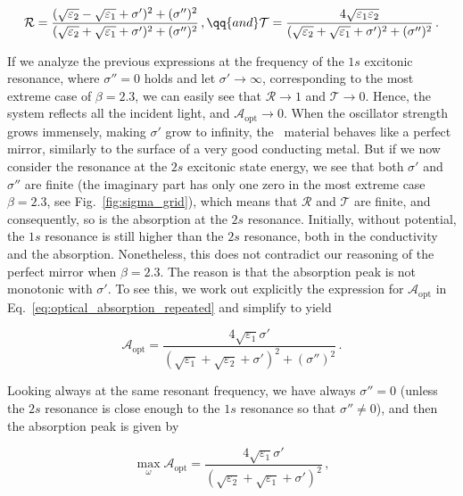 \begin{equation}
\label{eq:reflection_and_transmission}
    \mathcal{R} = \frac{(\sqrt{\varepsilon_2}- \sqrt{\varepsilon_1} + \sigma')^2 + (\sigma'')^2}{(\sqrt{\varepsilon_2} + \sqrt{\varepsilon_1} + \sigma')^2  + (\sigma'')^2} \,, \qq{and} \mathcal{T} = \frac{4 \sqrt{\varepsilon_1 \varepsilon_2}}{(\sqrt{\varepsilon_2} + \sqrt{\varepsilon_1} + \sigma')^2 + (\sigma'')^2}\,.
\end{equation}

\noindent If we analyze the previous expressions at the frequency of the $1s$ excitonic resonance, where $\sigma'' = 0$ holds and let $\sigma' \to \infty$, corresponding to the most extreme case of $\beta=2.3$, we can easily see that $\mathcal{R} \to 1$ and $\mathcal{T} \to 0$.
Hence, the system reflects all the incident light, and $ \mathcal{A}_{\mathrm{opt}} \to 0$.
When the oscillator strength grows immensely, making $\sigma'$ grow to infinity, the \bd~material behaves like a perfect mirror, similarly to the surface of a very good conducting metal.
But if we now consider the resonance at the $2s$ excitonic state energy, we see that both $\sigma'$ and $\sigma''$ are finite (the imaginary part has only one zero in the most extreme case $\beta=2.3$, see Fig.~\ref{fig:sigma_grid}), which means that $\mathcal{R}$ and $\mathcal{T}$ are finite, and consequently, so is the absorption at the $2s$ resonance.
Initially, without potential, the $1s$ resonance is still higher than the $2s$ resonance, both in the conductivity and the absorption.
Nonetheless, this does not contradict our reasoning of the perfect mirror when $\beta=2.3$.
The reason is that the absorption peak is not monotonic with $\sigma'$.
To see this, we work out explicitly the expression for $\mathcal{A}_{\mathrm{opt}}$ in Eq.~\eqref{eq:optical_absorption_repeated} and simplify to yield

\begin{equation}
    \mathcal{A}_{\mathrm{opt}} = \frac{4 \sqrt{\varepsilon_1} \sigma'}{ \left(\sqrt{\varepsilon_1} + \sqrt{\varepsilon_2} + \sigma'\right)^2 + (\sigma'')^2} \,.
\end{equation}

\noindent Looking always at the same resonant frequency, we have always $\sigma''=0$ (unless the $2s$ resonance is close enough to the $1s$ resonance so that $\sigma'' \neq 0$), and then the absorption peak is given by

\begin{equation}
    \max_{\omega}{\mathcal{A}_{\mathrm{opt}}} = \frac{4 \sqrt{\varepsilon_1} \sigma'}{(\sqrt{\varepsilon_2} + \sqrt{\varepsilon_1} + \sigma')^2}\,,
\end{equation}

